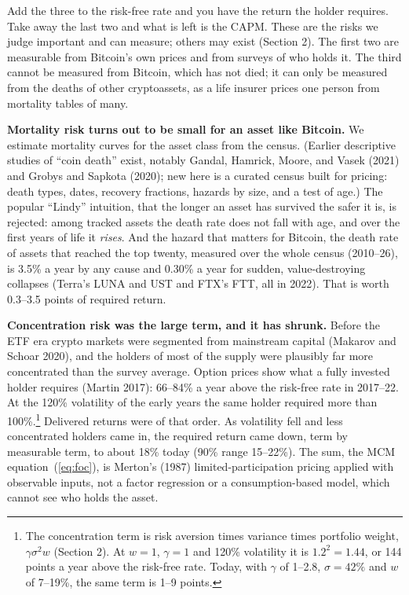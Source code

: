 \documentclass[11pt]{article}
\begin{document}
Add the three to the risk-free rate and you have the return the holder requires. Take away the last two and what is left is the CAPM. These are the risks we judge important and can measure; others may exist (Section 2). The first two are measurable from Bitcoin's own prices and from surveys of who holds it. The third cannot be measured from Bitcoin, which has not died; it can only be measured from the deaths of other cryptoassets, as a life insurer prices one person from mortality tables of many.

\textbf{Mortality risk turns out to be small for an asset like Bitcoin.} We estimate mortality curves for the asset class from the census. (Earlier descriptive studies of ``coin death'' exist, notably Gandal, Hamrick, Moore, and Vasek (2021) and Grobys and Sapkota (2020); new here is a curated census built for pricing: death types, dates, recovery fractions, hazards by size, and a test of age.) The popular ``Lindy'' intuition, that the longer an asset has survived the safer it is, is rejected: among tracked assets the death rate does not fall with age, and over the first years of life it \emph{rises}. And the hazard that matters for Bitcoin, the death rate of assets that reached the top twenty, measured over the whole census (2010--26), is 3.5\% a year by any cause and 0.30\% a year for sudden, value-destroying collapses (Terra's LUNA and UST and FTX's FTT, all in 2022). That is worth 0.3--3.5 points of required return.

\textbf{Concentration risk was the large term, and it has shrunk.} Before the ETF era crypto markets were segmented from mainstream capital (Makarov and Schoar 2020), and the holders of most of the supply were plausibly far more concentrated than the survey average. Option prices show what a fully invested holder requires (Martin 2017): 66--84\% a year above the risk-free rate in 2017--22. At the 120\% volatility of the early years the same holder required more than 100\%.\footnote{The concentration term is risk aversion times variance times portfolio weight, $\gamma\sigma^2 w$ (Section 2). At $w = 1$, $\gamma = 1$ and 120\% volatility it is $1.2^2 = 1.44$, or 144 points a year above the risk-free rate. Today, with $\gamma$ of 1--2.8, $\sigma = 42\%$ and $w$ of 7--19\%, the same term is 1--9 points.} Delivered returns were of that order. As volatility fell and less concentrated holders came in, the required return came down, term by measurable term, to about 18\% today (90\% range 15--22\%). The sum, the MCM equation~(\ref{eq:foc}), is Merton's (1987) limited-participation pricing applied with observable inputs, not a factor regression or a consumption-based model, which cannot see who holds the asset.
\end{document}
